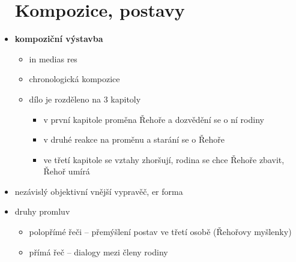 \documentclass[10pt,a4paper]{article}
\begin{document}
\begin{itemize}
\section*{Kompozice, postavy}
\item \textbf{kompoziční výstavba}
	\begin{itemize}
	\item in medias res
	\item chronologická kompozice
	\item dílo je rozděleno na 3 kapitoly
		\begin{itemize}
		\item v první kapitole proměna Řehoře a dozvědění se o ní rodiny
		\item v druhé reakce na proměnu a starání se o Řehoře
		\item ve třetí kapitole se vztahy zhoršují, rodina se chce Řehoře zbavit, Řehoř umírá
		\end{itemize}
	\end{itemize}
\item nezávislý objektivní vnější vypravěč, er forma
\item druhy promluv
	\begin{itemize}
	\item polopřímé řeči -- přemýšlení postav ve třetí osobě (Řehořovy myšlenky)
	\item přímá řeč -- dialogy mezi členy rodiny
	\end{itemize}
\end{itemize}
\end{document}
